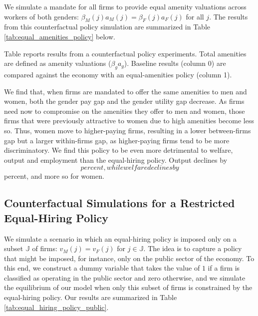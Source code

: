 We simulate a mandate for all firms to provide equal amenity valuations across workers of both genders: $\beta_{M}(j) a_{M}(j) = \beta_{F}(j) a_{F}(j)$ for all $j$. The results from this counterfactual policy simulation are summarized in Table \ref{tab:equal_amenities_policy} below.
%
\newline\indent
%
\begin{table}[htbp!]
    \caption{Effects of simulated equal amenities policy.}
    \label{tab:equal_amenities_policy}
    
    \begin{tablenotes}
        \footnotesize
        Table reports results from a counterfactual policy experiments. Total amenities are defined as amenity valuations ($\beta_{g} a_{g}$). Baseline results (column 0) are compared against the economy with an equal-amenities policy (column 1).
    \end{tablenotes}
    \begin{tablenotes}[Source]
        \sourcemodel%
    \end{tablenotes}
\end{table}
%

We find that, when firms are mandated to offer the same amenities to men and women, both the gender pay gap and the gender utility gap decrease. As firms need now to compromise on the amenities they offer to men and women, those firms that were previously attractive to women due to high amenities become less so. Thus, women move to higher-paying firms, resulting in a lower between-firms gap but a larger within-firms gap, as higher-paying firms tend to be more discriminatory. We find this policy to be even more detrimental to welfare, output and employment than the equal-hiring policy. Output declines by $$ percent, while welfare declines by $$ percent, and more so for women.


\subsection{Counterfactual Simulations for a Restricted Equal-Hiring Policy \label{app:equal_hiring_public-sector}}
%
We simulate a scenario in which an equal-hiring policy is imposed only on a subset $\mathbb{J}$ of firms: $v_{M}(j) = v_{F}(j)$ for $j \in \mathbb{J}$. The idea is to capture a policy that might be imposed, for instance, only on the public sector of the economy. To this end, we construct a dummy variable that takes the value of $1$ if a firm is classified as operating in the public sector and zero otherwise, and we simulate the equilibrium of our model when only this subset of firms is constrained by the equal-hiring policy. Our results are summarized in Table \ref{tab:equal_hiring_policy_public}.

